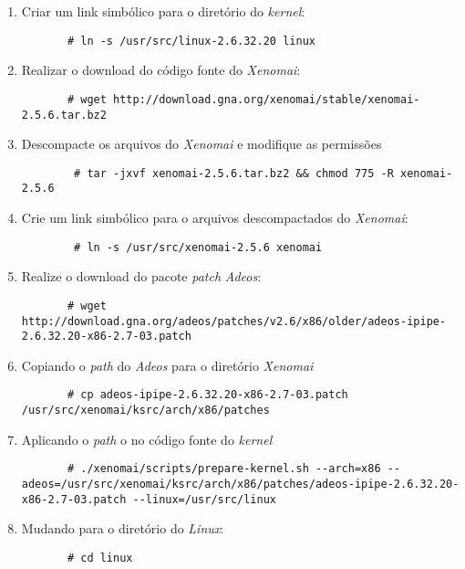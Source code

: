 \documentclass[a4paper,10pt]{article}
\begin{document}
\begin{enumerate}
\begin{enumerate}
	\item Criar um link simbólico para o diretório do \emph{kernel}:
	  \begin{lstlisting}
	   # ln -s /usr/src/linux-2.6.32.20 linux
	  \end{lstlisting}

	\item Realizar o download do código fonte do \emph{Xenomai}:
	  \begin{lstlisting}
	   # wget http://download.gna.org/xenomai/stable/xenomai-2.5.6.tar.bz2
	  \end{lstlisting}

	\item Descompacte os arquivos do \emph{Xenomai} e modifique as permissões
	  \begin{lstlisting}
	    # tar -jxvf xenomai-2.5.6.tar.bz2 && chmod 775 -R xenomai-2.5.6
	  \end{lstlisting}

	\item Crie um link simbólico para o arquivos descompactados do \emph{Xenomai}:
	  \begin{lstlisting}
	    # ln -s /usr/src/xenomai-2.5.6 xenomai
	  \end{lstlisting}

	\item Realize o download do pacote \emph{patch} \emph{Adeos}:
	  \begin{lstlisting}
	   # wget http://download.gna.org/adeos/patches/v2.6/x86/older/adeos-ipipe-2.6.32.20-x86-2.7-03.patch
	  \end{lstlisting}

	\item Copiando o \emph{path} do \emph{Adeos} para o diretório \emph{Xenomai}
	  \begin{lstlisting}
	   # cp adeos-ipipe-2.6.32.20-x86-2.7-03.patch /usr/src/xenomai/ksrc/arch/x86/patches
	  \end{lstlisting}

	\item Aplicando o \emph{path} o no código fonte do \emph{kernel}
	  \begin{lstlisting}
	   # ./xenomai/scripts/prepare-kernel.sh --arch=x86 --adeos=/usr/src/xenomai/ksrc/arch/x86/patches/adeos-ipipe-2.6.32.20-x86-2.7-03.patch --linux=/usr/src/linux
	  \end{lstlisting}

	\item Mudando para o diretório do \emph{Linux}:
	  \begin{lstlisting}
	   # cd linux
	  \end{lstlisting}


\end{enumerate}
\end{enumerate}
\end{document}
